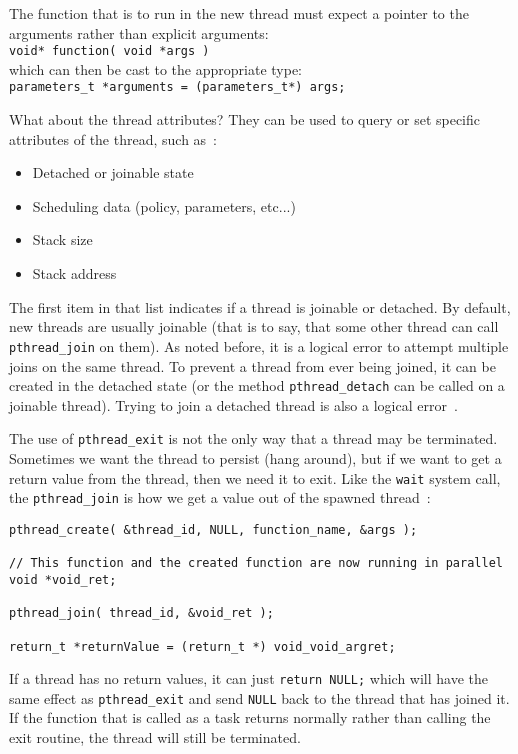 The function that is to run in the new thread must expect a pointer to the arguments rather than explicit arguments:\\
\texttt{void* function( void *args )}\\
which can then be cast to the appropriate type:\\
\texttt{parameters\_t *arguments = (parameters\_t*) args;}


What about the thread attributes? They can be used to query or set specific attributes of the thread, such as~\cite{pthreads}:
\begin{itemize}
	\item Detached or joinable state
	\item Scheduling data (policy, parameters, etc...)
	\item Stack size
	\item Stack address
\end{itemize}

The first item in that list indicates if a thread is joinable or detached. By default, new threads are usually joinable (that is to say, that some other thread can call \texttt{pthread\_join} on them). As noted before, it is a logical error to attempt multiple joins on the same thread. To prevent a thread from ever being joined, it can be created in the detached state (or the method \texttt{pthread\_detach} can be called on a joinable thread). Trying to join a detached thread is also a logical error~\cite{pthreads}.

The use of \texttt{pthread\_exit} is not the only way that a thread may be terminated. Sometimes we want the thread to persist (hang around), but if we want to get a return value from the thread, then we need it to exit. Like the \texttt{wait} system call, the \texttt{pthread\_join} is how we get a value out of the spawned thread~\cite{mte241}:

\begin{verbatim}
pthread_create( &thread_id, NULL, function_name, &args );

// This function and the created function are now running in parallel 
void *void_ret;

pthread_join( thread_id, &void_ret );

return_t *returnValue = (return_t *) void_void_argret;
\end{verbatim}

If a thread has no return values, it can just \texttt{return NULL;} which will have the same effect as \texttt{pthread\_exit} and send \texttt{NULL} back to the thread that has joined it. If the function that is called as a task returns normally rather than calling the exit routine, the thread will still be terminated. 

